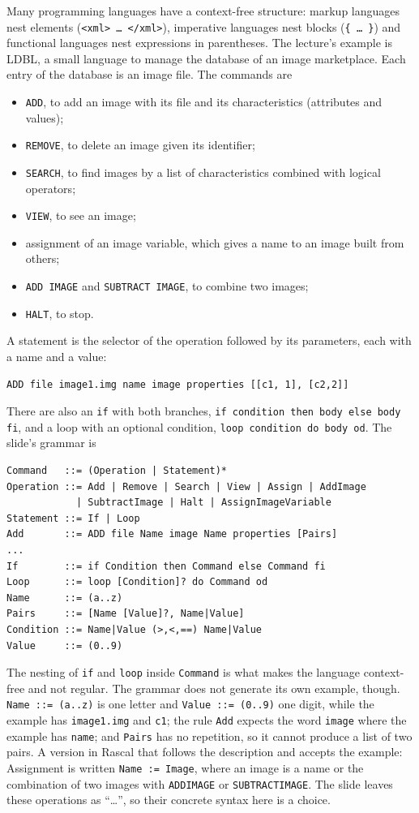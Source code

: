 Many programming languages have a context-free structure: markup languages
nest elements (\texttt{<xml> \dots{} </xml>}), imperative languages nest blocks
(\texttt{\{ \dots{} \}}) and functional languages nest expressions in
parentheses. The lecture's example is LDBL, a small language to manage the
database of an image marketplace. Each entry of the database is an image
file. The commands are
\begin{itemize}
  \item \texttt{ADD}, to add an image with its file and its characteristics
    (attributes and values);
  \item \texttt{REMOVE}, to delete an image given its identifier;
  \item \texttt{SEARCH}, to find images by a list of characteristics combined
    with logical operators;
  \item \texttt{VIEW}, to see an image;
  \item assignment of an image variable, which gives a name to an image built
    from others;
  \item \texttt{ADD IMAGE} and \texttt{SUBTRACT IMAGE}, to combine two images;
  \item \texttt{HALT}, to stop.
\end{itemize}
A statement is the selector of the operation followed by its parameters,
each with a name and a value:
\begin{lstlisting}
ADD file image1.img name image properties [[c1, 1], [c2,2]]
\end{lstlisting}
There are also an \texttt{if} with both branches,
\texttt{if condition then body else body fi}, and a loop with an optional
condition, \texttt{loop condition do body od}. The slide's grammar is
\begin{lstlisting}
Command   ::= (Operation | Statement)*
Operation ::= Add | Remove | Search | View | Assign | AddImage
            | SubtractImage | Halt | AssignImageVariable
Statement ::= If | Loop
Add       ::= ADD file Name image Name properties [Pairs]
...
If        ::= if Condition then Command else Command fi
Loop      ::= loop [Condition]? do Command od
Name      ::= (a..z)
Pairs     ::= [Name [Value]?, Name|Value]
Condition ::= Name|Value (>,<,==) Name|Value
Value     ::= (0..9)
\end{lstlisting}
The nesting of \texttt{if} and \texttt{loop} inside \texttt{Command} is what
makes the language context-free and not regular. The grammar does not
generate its own example, though. \texttt{Name ::= (a..z)} is one letter and
\texttt{Value ::= (0..9)} one digit, while the example has \texttt{image1.img}
and \texttt{c1}; the rule \texttt{Add} expects the word \texttt{image} where the
example has \texttt{name}; and \texttt{Pairs} has no repetition, so it cannot
produce a list of two pairs. A version in Rascal that follows the description
and accepts the example:
Assignment is written \texttt{Name := Image}, where an image is a name or the
combination of two images with \texttt{ADDIMAGE} or \texttt{SUBTRACTIMAGE}. The
slide leaves these operations as ``\dots'', so their concrete syntax here is a
choice.

